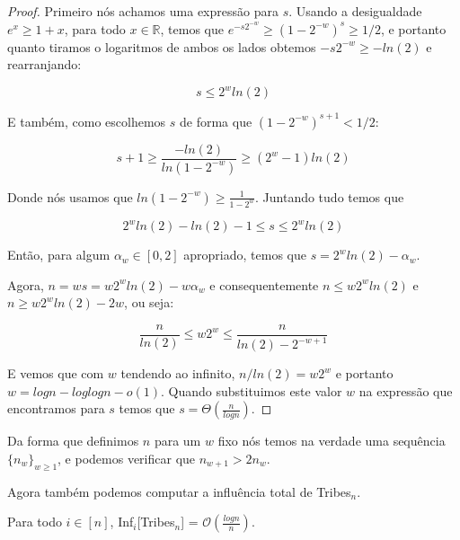 \begin{proof}

    Primeiro nós achamos uma expressão para $s$. Usando a desigualdade $e^{x} \geq 1 + x$, para todo $x \in \mathbb{R}$, temos que $e^{-s2^{-w}} \geq (1 - 2^{-w})^{s} \geq 1/2$, e portanto quanto tiramos o logaritmos de ambos os lados obtemos $-s2^{-w} \geq -ln(2)$ e rearranjando:

    \begin{equation*}
        s \leq 2^{w}ln(2)
    \end{equation*}

    E também, como escolhemos $s$ de forma que $(1 - 2^{-w})^{s + 1} < 1/2$:

    \begin{equation*}
        s + 1 \geq \frac{-ln(2)}{ln(1 - 2^{-w})} \geq (2^{w} - 1)ln(2)
    \end{equation*}

    Donde nós usamos que $ln(1 - 2^{-w}) \geq \frac{1}{1 - 2^{w}}$. Juntando tudo temos que 

    \begin{equation*}
       2^{w}ln(2) - ln(2) - 1 \leq s \leq 2^{w}ln(2)
    \end{equation*} 

    Então, para algum $\alpha_{w} \in [0, 2]$ apropriado, temos que $s = 2^{w}ln(2) - \alpha_{w}$. 

    Agora, $n = ws = w2^{w}ln(2) - w\alpha_{w}$ e consequentemente $n \leq w2^{w}ln(2)$ e $n \geq w2^{w}ln(2) - 2w$, ou seja:

    \begin{equation*}
        \frac{n}{ln(2)} \leq w2^{w} \leq \frac{n}{ln(2) - 2^{-w + 1}}
    \end{equation*}

    E vemos que com $w$ tendendo ao infinito, $n/ln(2) = w2^{w}$ e portanto $w = logn - loglogn - o(1)$. Quando substituimos este valor $w$ na expressão que encontramos para $s$ temos que $s = \Theta(\frac{n}{logn})$.

\end{proof}

Da forma que definimos $n$ para um $w$ fixo nós temos na verdade uma sequência $\{n_{w}\}_{w \geq 1}$, e podemos verificar que $n_{w + 1} > 2n_{w}$.

Agora também podemos computar a influência total de Tribes$_{n}$.

\begin{prop}

    Para todo $i \in [n]$, Inf$_{i}$[Tribes$_{n}$] = $\mathcal{O}(\frac{logn}{n})$.

\end{prop}

